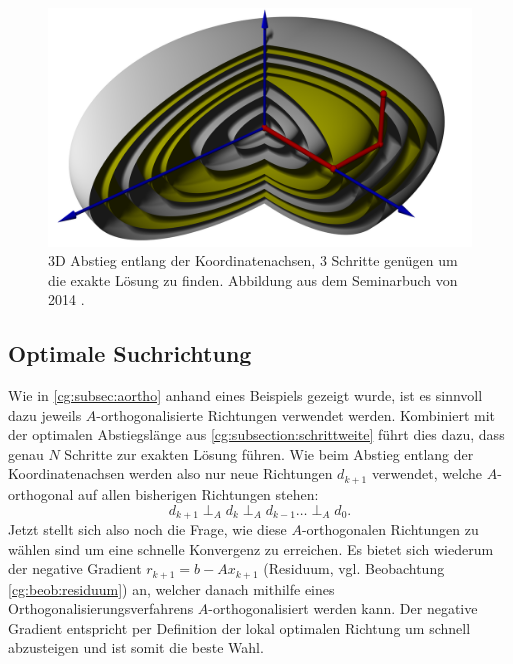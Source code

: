 \begin{figure}	
	\centering
	\includegraphics[width=0.8\hsize]{papers/cg/images/descent3d.jpg}
	\caption{3D Abstieg entlang der Koordinatenachsen, 3 Schritte genügen um die exakte Lösung zu finden. 
		Abbildung aus dem Seminarbuch von 2014 \cite{cg:book:hpc}.}
	\label{cg:abb:koordabstieg2}
\end{figure}

\subsection{Optimale Suchrichtung \label{cg:subsection:suchrichtung}}

Wie in \ref{cg:subsec:aortho} anhand eines Beispiels gezeigt wurde, ist es sinnvoll dazu jeweils $A$-orthogonalisierte Richtungen verwendet werden.
Kombiniert mit der optimalen Abstiegslänge aus \ref{cg:subsection:schrittweite} führt dies dazu, dass genau $N$ Schritte zur exakten Lösung führen.
Wie beim Abstieg entlang der Koordinatenachsen werden also nur neue Richtungen $d_{k+1}$ verwendet, welche $A$-orthogonal auf allen bisherigen Richtungen stehen:
\begin{equation}
	d_{k+1}  \perp_A  d_k  \perp_A  d_{k-1}  \dots \perp_A  d_0.
\end{equation}
Jetzt stellt sich also noch die Frage, wie diese $A$-orthogonalen Richtungen zu wählen sind um eine schnelle Konvergenz zu erreichen.
Es bietet sich wiederum der negative Gradient $r_{k+1} = b - Ax_{k+1}$ (Residuum, vgl. Beobachtung \ref{cg:beob:residuum}) an, welcher danach mithilfe eines Orthogonalisierungsverfahrens $A$-orthogonalisiert werden kann.
Der negative Gradient entspricht per Definition der lokal optimalen Richtung um schnell abzusteigen und ist somit die beste Wahl.

